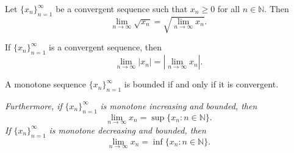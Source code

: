 \documentclass[../main.tex]{subfiles}
\begin{document}
    
    
    
    
    
    
    
    
    
    
    
    
    
    \begin{exercise} \label{ex: sqrt of lim}
    Let \( \{x_n\}_{n=1}^{\infty} \) be a convergent sequence such that \( x_n \geq 0 \) for all \( n \in \mathbb{N} \). Then
    \[
    \lim_{n \to \infty} \sqrt{x_n} = \sqrt{\lim_{n \to \infty} x_n }.
    \]
    \end{exercise}
    
    
    
    
    
    
    
    
    
    
    
    
    
    
    
    
    
    
    
    
    
    
    
    
    
    
    
    
    
    
    \begin{exercise} \label{ex: limit of absolute value sequence}
    If \( \{x_n\}_{n=1}^{\infty} \) is a convergent sequence, then
    \[
    \lim_{n \to \infty} |x_n| = \left| \lim_{n \to \infty} x_n \right|.
    \]
    \end{exercise}
    
    
    
    
    
    
    
    
    
    
    
    
    
    
    
    
    
    
    
    
    
    
    
    
    
    
    
    
    \begin{theorem} \label{thm: monotone convergence theorem}
    A monotone sequence \(\{x_n\}_{n=1}^{\infty}\) is bounded if and only if it is convergent.
    
    \textit{Furthermore, if} \(\{x_n\}_{n=1}^{\infty}\) \textit{is monotone increasing and bounded, then}
    \[
    \lim_{n \to \infty} x_n = \sup \{x_n : n \in \mathbb{N} \}.
    \]
    \textit{If} \(\{x_n\}_{n=1}^{\infty}\) \textit{is monotone decreasing and bounded, then}
    \[
    \lim_{n \to \infty} x_n = \inf \{x_n : n \in \mathbb{N} \}.
    \]
    \end{theorem}
    
\end{document}
